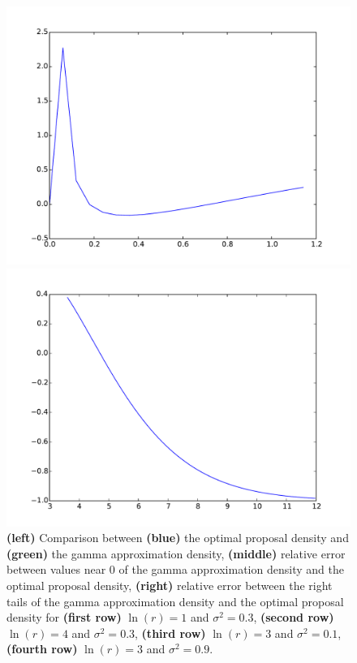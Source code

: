 \documentclass{article}
\begin{document}
\begin{figure}[htb]
\begin{minipage}{.3\textwidth}
	\end{minipage}
	\begin{minipage}{.3\textwidth}
		\centering
		\includegraphics[width=0.97\linewidth]{bootstrap-filter/relative_beginning_simple_3_9.pdf}
	\end{minipage}
	\begin{minipage}{.3\textwidth}
		\centering
		\includegraphics[width=0.97\linewidth]{bootstrap-filter/relative_tail_simple_3_9.pdf}
	\end{minipage}
	\caption{\textbf{(left)} Comparison between \textbf{(blue)} the optimal proposal density and \textbf{(green)} the gamma approximation density, \textbf{(middle)} relative error between values near 0 of the gamma approximation density and the optimal proposal density, \textbf{(right)} relative error between the right tails of the gamma approximation density and the optimal proposal density for \textbf{(first row)} $\ln(r)=1$ and $\sigma^2 = 0.3$, \textbf{(second row)} $\ln(r)=4$ and $\sigma^2 = 0.3$, \textbf{(third row)} $\ln(r)=3$ and $\sigma^2 = 0.1$, \textbf{(fourth row)} $\ln(r)=3$ and $\sigma^2 = 0.9$.}
	\label{fig:movingsimple}
\end{figure}
\end{document}
